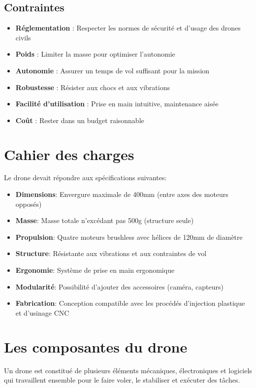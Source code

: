 \documentclass[a4paper,12pt]{report}
\begin{document}
\subsection{Contraintes}
\begin{itemize}
    \item \textbf{Réglementation} : Respecter les normes de sécurité et d'usage des drones civils
    \item \textbf{Poids} : Limiter la masse pour optimiser l'autonomie
    \item \textbf{Autonomie} : Assurer un temps de vol suffisant pour la mission
    \item \textbf{Robustesse} : Résister aux chocs et aux vibrations
    \item \textbf{Facilité d'utilisation} : Prise en main intuitive, maintenance aisée
    \item \textbf{Coût} : Rester dans un budget raisonnable
\end{itemize}

\section{Cahier des charges}
Le drone devait répondre aux spécifications suivantes:
\begin{itemize}
    \item \textbf{Dimensions}: Envergure maximale de 400mm (entre axes des moteurs opposés)
    \item \textbf{Masse}: Masse totale n'excédant pas 500g (structure seule)
    \item \textbf{Propulsion}: Quatre moteurs brushless avec hélices de 120mm de diamètre
    \item \textbf{Structure}: Résistante aux vibrations et aux contraintes de vol
    \item \textbf{Ergonomie}: Système de prise en main ergonomique
    \item \textbf{Modularité}: Possibilité d'ajouter des accessoires (caméra, capteurs)
    \item \textbf{Fabrication}: Conception compatible avec les procédés d'injection plastique et d'usinage CNC
\end{itemize}

\section{Les composantes du drone}
Un drone est constitué de plusieurs éléments mécaniques, électroniques et logiciels qui travaillent ensemble pour le faire voler, le stabiliser et exécuter des tâches.
\end{document}
